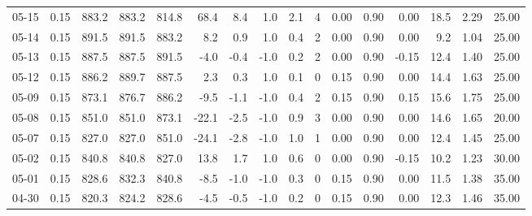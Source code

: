\begin{threeparttable}
{\begin{tabular}{lrrrrrrrrrrrrrrr}
  05-15 &     0.15 & 883.2 & 883.2 & 814.8 &       68.4 &            8.4 &                      1.0 &                 2.1 &              4 &       0.00 &      0.90 &           0.00 &             18.5 &            2.29 &                  25.00 \\
  05-14 &     0.15 & 891.5 & 891.5 & 883.2 &        8.2 &            0.9 &                      1.0 &                 0.4 &              2 &       0.00 &      0.90 &           0.00 &              9.2 &            1.04 &                  25.00 \\
  05-13 &     0.15 & 887.5 & 887.5 & 891.5 &       -4.0 &           -0.4 &                     -1.0 &                 0.2 &              2 &       0.00 &      0.90 &          -0.15 &             12.4 &            1.40 &                  25.00 \\
  05-12 &     0.15 & 886.2 & 889.7 & 887.5 &        2.3 &            0.3 &                      1.0 &                 0.1 &              0 &       0.15 &      0.90 &           0.00 &             14.4 &            1.63 &                  25.00 \\
  05-09 &     0.15 & 873.1 & 876.7 & 886.2 &       -9.5 &           -1.1 &                     -1.0 &                 0.4 &              2 &       0.15 &      0.90 &           0.15 &             15.6 &            1.75 &                  25.00 \\
  05-08 &     0.15 & 851.0 & 851.0 & 873.1 &      -22.1 &           -2.5 &                     -1.0 &                 0.9 &              3 &       0.00 &      0.90 &           0.00 &             14.6 &            1.65 &                  20.00 \\
  05-07 &     0.15 & 827.0 & 827.0 & 851.0 &      -24.1 &           -2.8 &                     -1.0 &                 1.0 &              1 &       0.00 &      0.90 &           0.00 &             12.4 &            1.45 &                  25.00 \\
  05-02 &     0.15 & 840.8 & 840.8 & 827.0 &       13.8 &            1.7 &                      1.0 &                 0.6 &              0 &       0.00 &      0.90 &          -0.15 &             10.2 &            1.23 &                  30.00 \\
  05-01 &     0.15 & 828.6 & 832.3 & 840.8 &       -8.5 &           -1.0 &                     -1.0 &                 0.3 &              0 &       0.15 &      0.90 &           0.00 &             11.5 &            1.38 &                  35.00 \\
  04-30 &     0.15 & 820.3 & 824.2 & 828.6 &       -4.5 &           -0.5 &                     -1.0 &                 0.2 &              0 &       0.15 &      0.90 &           0.00 &             12.3 &            1.46 &                  35.00 \\

\end{tabular}}
\end{threeparttable}

